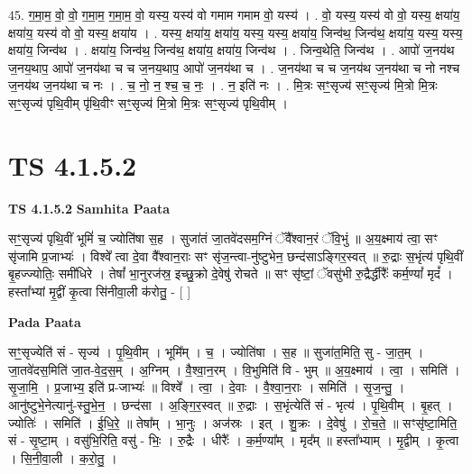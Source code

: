 \documentclass[17pt]{extarticle}
\begin{document}
45. ग॒मा॒म॒ वो॒ वो॒ ग॒मा॒म॒ ग॒मा॒म॒ वो॒ यस्य॒ यस्य॑ वो गमाम गमाम वो॒ यस्य॑ । . वो॒ यस्य॒ यस्य॑ वो वो॒ यस्य॒ क्षया॑य॒ क्षया॑य॒ यस्य॑ वो वो॒ यस्य॒ क्षया॑य । . यस्य॒ क्षया॑य॒ क्षया॑य॒ यस्य॒ यस्य॒ क्षया॑य॒ जिन्व॑थ॒ जिन्व॑थ॒ क्षया॑य॒ यस्य॒ यस्य॒ क्षया॑य॒ जिन्व॑थ । . क्षया॑य॒ जिन्व॑थ॒ जिन्व॑थ॒ क्षया॑य॒ क्षया॑य॒ जिन्व॑थ । . जिन्व॒थेति॒ जिन्व॑थ । . आपो॑ ज॒नय॑थ ज॒नय॒थाप॒ आपो॑ ज॒नय॑था च च ज॒नय॒थाप॒ आपो॑ ज॒नय॑था च । . ज॒नय॑था च च ज॒नय॑थ ज॒नय॑था च नो नश्च ज॒नय॑थ ज॒नय॑था च नः । . च॒ नो॒ न॒ श्च॒ च॒ नः॒ । . न॒ इति॑ नः । . मि॒त्रः सꣳ॒॒सृज्य॑ सꣳ॒॒सृज्य॑ मि॒त्रो मि॒त्रः सꣳ॒॒सृज्य॑ पृथि॒वीम् पृ॑थि॒वीꣳ सꣳ॒॒सृज्य॑ मि॒त्रो मि॒त्रः सꣳ॒॒सृज्य॑ पृथि॒वीम् । \newline
\pagebreak
{}

\section{ TS 4.1.5.2 }

\textbf{TS 4.1.5.2 } \newline
\textbf{Samhita Paata} \newline

सꣳ॒॒सृज्य॑ पृथि॒वीं भूमिं॑ च॒ ज्योति॑षा स॒ह । सुजा॑तं जा॒तवे॑दसम॒ग्निं ॅवै᳚श्वान॒रं ॅवि॒भुं ॥ अ॒य॒क्ष्माय॑ त्वा॒ सꣳ सृ॑जामि प्र॒जाभ्यः॑ । विश्वे᳚ त्वा दे॒वा वै᳚श्वान॒राः सꣳ सृ॑ज॒न्त्वा-नु॑ष्टुभेन॒ छन्द॑साऽङ्गिर॒स्वत् ॥ रु॒द्राः स॒भृंत्य॑ पृथि॒वीं बृ॒हज्ज्योतिः॒ समी॑धिरे । तेषां᳚ भा॒नुरज॑स्र॒ इच्छु॒क्रो दे॒वेषु॑ रोचते ॥ सꣳ सृ॑ष्टां॒ ॅवसु॑भी रु॒द्रैर्द्धीरैः᳚ कर्म॒ण्यां᳚ मृदं᳚ । हस्ता᳚भ्यां मृ॒द्वीं कृ॒त्वा सि॑नीवा॒ली क॑रोतु॒ - [  ] \newline

\textbf{Pada Paata} \newline

सꣳ॒॒सृज्येति॑ सं - सृज्य॑ । पृ॒थि॒वीम् । भूमि᳚म् । च॒ । ज्योति॑षा । स॒ह ॥ सुजा॑त॒मिति॒ सु - जा॒त॒म् । जा॒तवे॑दस॒मिति॑ जा॒त-वे॒द॒स॒म् । अ॒ग्निम् । वै॒श्वा॒न॒रम् । वि॒भुमिति॑ वि - भुम् ॥ अ॒य॒क्ष्माय॑ । त्वा॒ । समिति॑ । सृ॒जा॒मि॒ । प्र॒जाभ्य॒ इति॑ प्र-जाभ्यः॑ ॥ विश्वे᳚ । त्वा॒ । दे॒वाः । वै॒श्वा॒न॒राः । समिति॑ । सृ॒ज॒न्तु॒ । आनु॑ष्टुभे॒नेत्यानु॑-स्तु॒भे॒न॒ । छन्द॑सा । अ॒ङ्गि॒र॒स्वत् ॥ रु॒द्राः । स॒भृंत्येति॑ सं - भृत्य॑ । पृ॒थि॒वीम् । बृ॒हत् । ज्योतिः॑ । समिति॑ । ई॒धि॒रे॒ ॥ तेषा᳚म् । भा॒नुः । अज॑स्रः । इत् । शु॒क्रः । दे॒वेषु॑ । रो॒च॒ते॒ ॥ सꣳसृ॑ष्टा॒मिति॒ सं - सृ॒ष्टा॒म् । वसु॑भि॒रिति॒ वसु॑ - भिः॒ । रु॒द्रैः । धीरैः᳚ । क॒र्म॒ण्या᳚म् । मृद᳚म् ॥ हस्ता᳚भ्याम् । मृ॒द्वीम् । कृ॒त्वा । सि॒नी॒वा॒ली । क॒रो॒तु॒ ।  \newline
\end{document}
